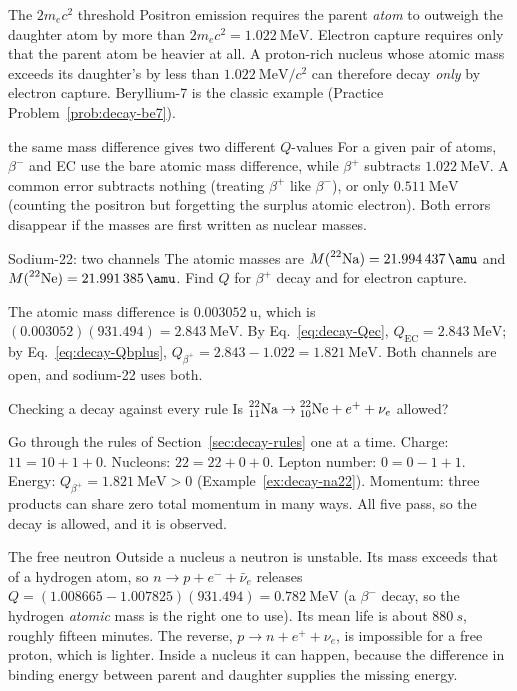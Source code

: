 \begin{keybox}{The $2m_ec^2$ threshold}
Positron emission requires the parent \emph{atom} to outweigh the daughter atom by more than
$2m_ec^2=\SI{1.022}{\MeV}$. Electron capture requires only that the parent atom be heavier at all. A
proton-rich nucleus whose atomic mass exceeds its daughter's by less than $\SI{1.022}{\MeV}/c^2$ can
therefore decay \emph{only} by electron capture. Beryllium-7 is the classic example
(Practice Problem~\ref{prob:decay-be7}).
\end{keybox}

\begin{trapbox}{the same mass difference gives two different $Q$-values}
For a given pair of atoms, $\beta^-$ and EC use the bare atomic mass difference, while $\beta^+$ subtracts
$\SI{1.022}{\MeV}$. A common error subtracts nothing (treating $\beta^+$ like $\beta^-$), or only
$\SI{0.511}{\MeV}$ (counting the positron but forgetting the surplus atomic electron). Both errors
disappear if the masses are first written as nuclear masses.
\end{trapbox}

\begin{exbox}{Sodium-22: two channels}\label{ex:decay-na22}
The atomic masses are $M(\iso{22}{Na})=\SI{21.994437}{\amu}$ and $M(\iso{22}{Ne})=\SI{21.991385}{\amu}$. Find
$Q$ for $\beta^+$ decay and for electron capture.

The atomic mass difference is $\SI{0.003052}{\amu}$, which is $(0.003052)(931.494)=\SI{2.843}{\MeV}$. By
Eq.~\eqref{eq:decay-Qec}, $Q_{\mathrm{EC}}=\SI{2.843}{\MeV}$; by Eq.~\eqref{eq:decay-Qbplus},
$Q_{\beta^+}=2.843-1.022=\SI{1.821}{\MeV}$. Both channels are open, and sodium-22 uses both.
\end{exbox}

\begin{exbox}{Checking a decay against every rule}\label{ex:decay-na22check}
Is $\prescript{22}{11}{\mathrm{Na}}\to\prescript{22}{10}{\mathrm{Ne}}+e^++\nu_e$ allowed?

Go through the rules of Section~\ref{sec:decay-rules} one at a time. Charge: $11=10+1+0$. Nucleons:
$22=22+0+0$. Lepton number: $0=0-1+1$. Energy: $Q_{\beta^+}=\SI{1.821}{\MeV}>0$
(Example~\ref{ex:decay-na22}). Momentum: three products can share zero total momentum in many ways. All
five pass, so the decay is allowed, and it is observed. 
\end{exbox}

\begin{remarkbox}{The free neutron}
Outside a nucleus a neutron is unstable. Its mass exceeds that of a hydrogen atom, so
$n\to p+e^-+\bar\nu_e$ releases $Q=(1.008665-1.007825)(931.494)=\SI{0.782}{\MeV}$ (a $\beta^-$ decay, so
the hydrogen \emph{atomic} mass is the right one to use). Its mean life is about $\SI{880}{s}$, roughly
fifteen minutes. The reverse, $p\to n+e^++\nu_e$, is impossible for a free proton, which is lighter.
Inside a nucleus it can happen, because the difference in binding energy between parent and daughter
supplies the missing energy.
\end{remarkbox}


